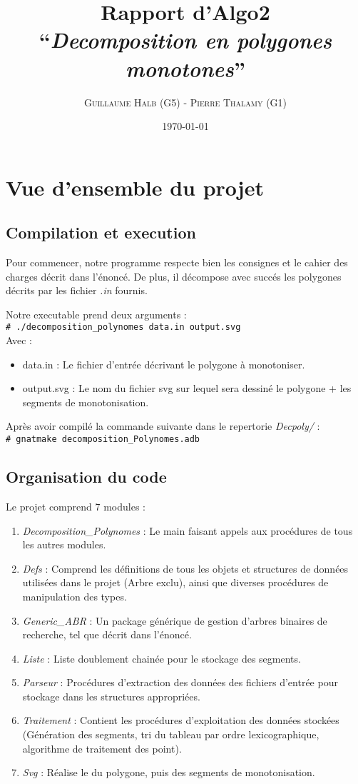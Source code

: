 \documentclass[10.9pt]{article}
\title{Rapport d'Algo2\\
  ``{\em Decomposition en polygones monotones}'' }
\author{\textsc{Guillaume Halb (G5)} - \textsc{Pierre Thalamy (G1)}}
\date{\today}
\newcommand{\shellcmd}[1]{\\\indent\indent\texttt{\footnotesize\# #1}\\}
\begin{document}
\maketitle

\section{Vue d'ensemble du projet}
\subsection{Compilation et execution}
Pour commencer, notre programme respecte bien les consignes et le
cahier des charges décrit dans l'énoncé. De plus, il décompose avec
succés les polygones décrits par les fichier \emph{.in} fournis.

Notre executable prend deux arguments :
\shellcmd{./decomposition\_polynomes data.in output.svg}
Avec : 
\begin{itemize}
  \item data.in : Le fichier d'entrée décrivant le polygone à
    monotoniser.
  \item output.svg : Le nom du fichier svg sur lequel sera dessiné le
    polygone + les segments de monotonisation.
\end{itemize}
Après avoir compilé la commande suivante dans le repertorie \emph{Decpoly/} :
\shellcmd{gnatmake decomposition\_Polynomes.adb}

\subsection{Organisation du code}

Le projet comprend 7 modules :
\begin{enumerate}
\item \emph{Decomposition\_Polynomes} : Le main faisant appels aux procédures de tous
  les autres modules.
\item \emph{Defs} : Comprend les définitions de tous les objets et
  structures de données utilisées dans le projet (Arbre exclu), ainsi que diverses
  procédures de manipulation des types.
\item \emph{Generic\_ABR} : Un package générique de gestion d'arbres
  binaires de recherche, tel que décrit dans l'énoncé. 
\item \emph{Liste} : Liste doublement chainée pour le stockage des
  segments.
\item \emph{Parseur} : Procédures d'extraction des données des fichiers
  d'entrée pour stockage dans les structures appropriées.
\item \emph{Traitement} : Contient les procédures d'exploitation des
  données stockées (Génération des segments, tri du
  tableau par ordre lexicographique, algorithme de traitement des point).
\item \emph{Svg} : Réalise le du polygone, puis des segments de monotonisation.
\end{enumerate}
\end{document}
